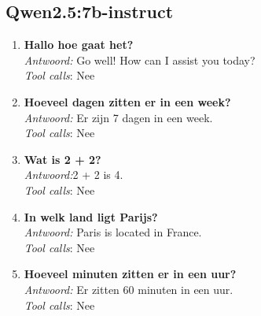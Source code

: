 \subsection{Qwen2.5:7b-instruct}
\begin{enumerate}
    \item \textbf{Hallo hoe gaat het?}\\
    \textit{Antwoord:} Go well! How can I assist you today? \\
    \textit{Tool calls}: Nee
    \item \textbf{Hoeveel dagen zitten er in een week?}\\
    \textit{Antwoord:} Er zijn 7 dagen in een week. \\
    \textit{Tool calls}: Nee 
    \item \textbf{Wat is 2 + 2?}\\
    \textit{Antwoord:}2 + 2 is 4. \\
    \textit{Tool calls}: Nee 
    \item \textbf{In welk land ligt Parijs?}\\
    \textit{Antwoord:} Paris is located in France. \\
    \textit{Tool calls}: Nee 
    \item \textbf{Hoeveel minuten zitten er in een uur?}\\
    \textit{Antwoord:} Er zitten 60 minuten in een uur. \\
    \textit{Tool calls}: Nee 
\end{enumerate}

